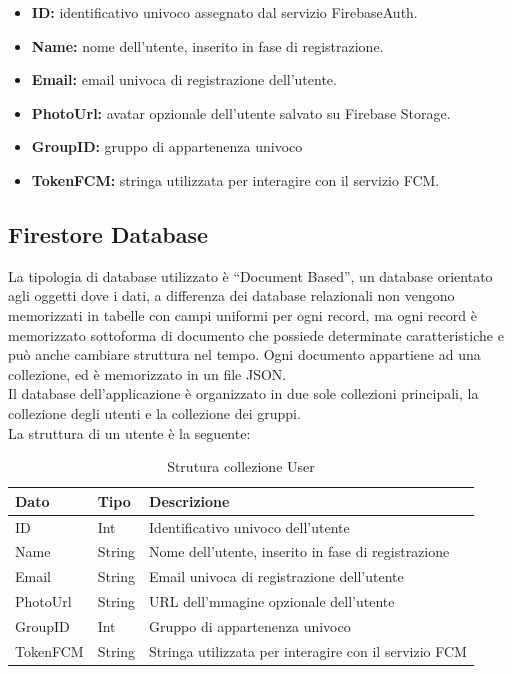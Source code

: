 \begin{itemize}
    \item \textbf{ID:} identificativo univoco assegnato dal servizio FirebaseAuth.
    \item \textbf{Name:} nome dell'utente, inserito in fase di registrazione.
    \item \textbf{Email:} email univoca di registrazione dell'utente.
    \item \textbf{PhotoUrl:} avatar opzionale dell'utente salvato su Firebase Storage.
    \item \textbf{GroupID:} gruppo di appartenenza univoco
    \item \textbf{TokenFCM:} stringa utilizzata per interagire con il servizio FCM.
\end{itemize}

\newpage



\subsection{Firestore Database}
La tipologia di database utilizzato è ``Document Based'', un database orientato agli oggetti dove i dati, a differenza dei database relazionali non vengono memorizzati in tabelle con campi uniformi per ogni record, ma ogni record è memorizzato sottoforma di documento che possiede determinate caratteristiche e può anche cambiare struttura nel tempo. Ogni documento appartiene ad una collezione, ed è memorizzato in un file JSON.\\
Il database dell'applicazione è organizzato in due sole collezioni principali, la collezione degli utenti e la collezione dei gruppi.\\
La struttura di un utente è la seguente:

\begin{table}[h]
\begin{center}
\begin{tabular}{|l|l|l|}
    \hline
\textbf{Dato} & \textbf{Tipo}  & \textbf{Descrizione}\\ \hline
ID & Int & Identificativo univoco dell'utente \\\hline
Name & String & Nome dell'utente, inserito in fase di registrazione \\ \hline
Email & String & Email univoca di registrazione dell'utente \\ \hline
PhotoUrl & String & URL dell'mmagine opzionale dell'utente \\ \hline
GroupID & Int &  Gruppo di appartenenza univoco \\ \hline
TokenFCM & String & Stringa utilizzata per interagire con il servizio FCM \\
\hline
\end{tabular}
\caption[Dati Firestore]{Strutura collezione User}\label{tab:Strutture collezione User}
\end{center}
\end{table}

